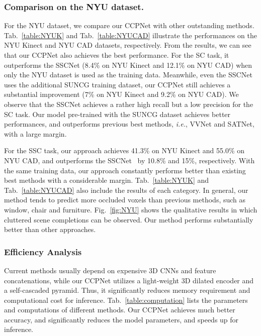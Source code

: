 \documentclass[10pt,twocolumn,letterpaper]{article}
\begin{document}
\subsubsection{Comparison on the NYU dataset.}
For the NYU dataset, we compare our CCPNet with other outstanding methods.
Tab.~\ref{table:NYUK} and Tab.~\ref{table:NYUCAD} illustrate the performances on the NYU Kinect and NYU CAD datasets, respectively.
From the results, we can see that our CCPNet also achieves the best performance.
For the SC task, it outperforms the SSCNet (8.4\% on NYU Kinect and 12.1\% on NYU CAD) when only the NYU dataset is used as the training data.
Meanwhile, even the SSCNet uses the additional SUNCG training dataset, our CCPNet still achieves a substantial improvement (7\% on NYU Kinect and 9.2\% on NYU CAD).
We observe that the SSCNet achieves a rather high recall but a low precision for the SC task.
Our model pre-trained with the SUNCG dataset achieves better performances, and outperforms previous best methods, \emph{i.e.}, VVNet and SATNet, with a large margin.

For the SSC task, our approach achieves 41.3\% on NYU Kinect and 55.0\% on NYU CAD, and outperforms the SSCNet~\cite{song2017semantic} by 10.8\% and 15\%, respectively.
With the same training data, our approach constantly performs better than existing best methods with a considerable margin.
Tab.~\ref{table:NYUK} and Tab.~\ref{table:NYUCAD} also include the results of each category.
In general, our method tends to predict more occluded voxels than previous methods, such as window, chair and furniture. Fig.~\ref{fig:NYU} shows the qualitative results in which cluttered scene completions can be observed.
Our method performs substantially better than other approaches.
\subsubsection{Efficiency Analysis}
Current methods usually depend on expensive 3D CNNs and feature concatenations, while our CCPNet utilizes a light-weight 3D dilated encoder and a self-cascaded pyramid.
Thus, it significantly reduces memory requirement and computational cost for inference.
Tab.~\ref{table:computation} lists the parameters and computations of different methods.
Our CCPNet achieves much better accuracy, and significantly reduces the model parameters, and speeds up for inference.
\end{document}
